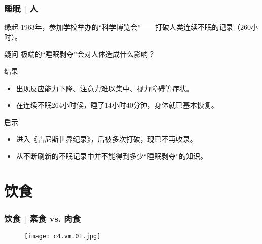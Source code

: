 \begin{frame}
  \frametitle{睡眠 | 人}
  \begin{block}{缘起}
    1963年，参加学校举办的“科学博览会”——打破人类连续不眠的记录（260小时）。
  \end{block}
  \pause
  \begin{block}{疑问}
    极端的“睡眠剥夺”会对人体造成什么影响？
  \end{block}
  \pause
  \begin{block}{结果}
    \begin{itemize}
      \item 出现反应能力下降、注意力难以集中、视力障碍等症状。
      \item 在连续不眠264小时候，睡了14小时40分钟，身体就已基本恢复。
    \end{itemize}
  \end{block}
  \pause
  \begin{block}{启示}
    \begin{itemize}
      \item 进入《吉尼斯世界纪录》，后被多次打破，现已不再收录。
      \item 从不断刷新的不眠记录中并不能得到多少“睡眠剥夺”的知识。
    \end{itemize}
  \end{block}
\end{frame}

\section{饮食}
\begin{frame}
  \frametitle{饮食 | 素食 vs. 肉食}
  \begin{figure}
    \centering
    \texttt{[image: c4.vm.01.jpg]}
  \end{figure}
\end{frame}


